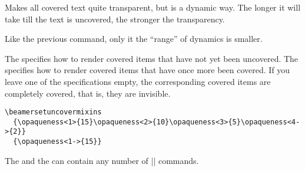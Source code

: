 \begin{command}{\beamertemplatetransparentcovereddynamic}
  Makes all covered text quite transparent, but is a dynamic way. The
  longer it will take till the text is uncovered, the stronger the
  transparency. 
\end{command}

\begin{command}{\beamertemplatetransparentcovereddynamicmedium}
  Like the previous command, only it the ``range'' of dynamics is
  smaller. 
\end{command}

\begin{command}{\beamersetuncovermixins{}%
    }
  The  specifies  how to render covered items that
  have not  yet been uncovered. The  specifies
  how to render covered items that have once more been covered. 
  If you leave one of the specifications empty, the corresponding
  covered items are completely covered, that is, they are invisible.
  \example
\begin{verbatim}
\beamersetuncovermixins
  {\opaqueness<1>{15}\opaqueness<2>{10}\opaqueness<3>{5}\opaqueness<4->{2}}
  {\opaqueness<1->{15}}
\end{verbatim}
  The  and the   can
  contain any number of |\opaqueness| commands.
\end{command}

